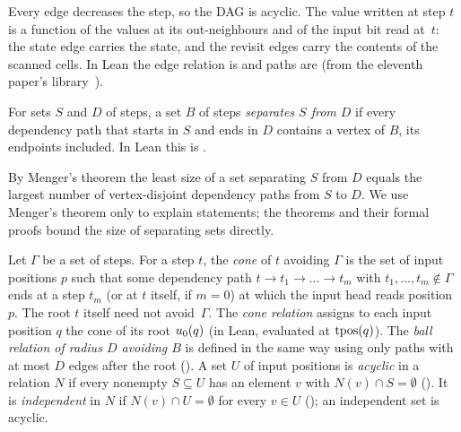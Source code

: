 Every edge decreases the step, so the DAG is acyclic. The value written at step $t$ is a function of the values at its
out-neighbours and of the input bit read at~$t$: the state edge carries the state, and the revisit edges carry the contents of the
scanned cells. In Lean the edge relation is  and paths are  (from the eleventh
paper's library~\cite{MergeDepth2026}).

\begin{definition}[Cuts]\label{def:cut}
For sets $S$ and $D$ of steps, a set $B$ of steps \emph{separates $S$ from $D$} if every dependency path that starts in $S$ and
ends in $D$ contains a vertex of $B$, its endpoints included. In Lean this is .
\end{definition}

By Menger's theorem the least size of a set separating $S$ from $D$ equals the largest number of vertex-disjoint dependency paths
from $S$ to $D$. We use Menger's theorem only to explain statements; the theorems and their formal proofs bound the size of
separating sets directly.

\begin{definition}\label{def:cone}
Let $\Gamma$ be a set of steps. For a step $t$, the \emph{cone} of $t$ avoiding $\Gamma$ is the set of input positions $p$ such
that some dependency path $t\to t_1\to\dots\to t_m$ with $t_1,\dots,t_m\notin\Gamma$ ends at a step $t_m$ (or at $t$ itself, if
$m=0$) at which the input head reads position $p$. The root $t$ itself need not avoid~$\Gamma$. The \emph{cone relation}
assigns to each input position $q$ the cone of its root $u_0(q)$ (in Lean,  evaluated at $\mathrm{tpos}(q)$). The
\emph{ball relation of radius $D$ avoiding $B$} is defined in the same way using only paths with at most $D$ edges after the
root (). A set $U$ of input positions is \emph{acyclic} in a relation $N$ if every nonempty $S\subseteq U$
has an element $v$ with $N(v)\cap S=\emptyset$ (). It is \emph{independent} in $N$ if
$N(v)\cap U=\emptyset$ for every $v\in U$ (); an independent set is acyclic.
\end{definition}


